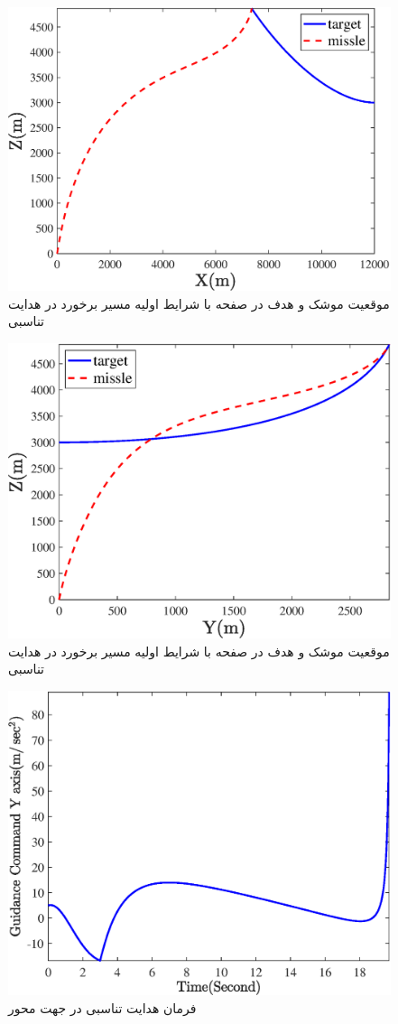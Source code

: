 \begin{figure}[H]
	\centering
	\includegraphics[width=.75\linewidth]{../Figure/Q1/a/xz_sec_II}
	\caption{موقعیت موشک و هدف در صفحه 
		با شرایط اولیه مسیر برخورد در هدایت تناسبی}
\end{figure}

\begin{figure}[H]
	\centering
	\includegraphics[width=.75\linewidth]{../Figure/Q1/a/yz_sec_II}
	\caption{موقعیت موشک و هدف در صفحه 
		با شرایط اولیه مسیر برخورد در هدایت تناسبی}
\end{figure}



\begin{figure}[H]
	\centering
	\includegraphics[width=.75\linewidth]{../Figure/Q1/a/GC_y}
	\caption{فرمان هدایت تناسبی در جهت محور }
\end{figure}

